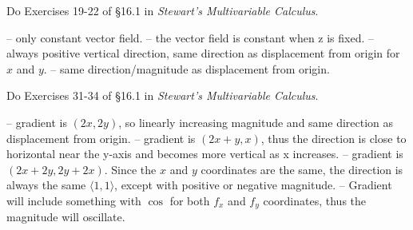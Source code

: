 \documentclass[12pt]{exam}
\begin{document}
\begin{questions}
\begin{solution}
\begin{questions}
		\end{questions}
	\end{solution}
\setcounter{question}{7}
\question Do Exercises 19-22 of §16.1 in \emph{Stewart's Multivariable Calculus}.
	\begin{solution}
		\begin{questions}
			\setcounter{question}{18}
			\question {} -- only constant vector field.
			\question {} -- the vector field is constant when z is fixed.
			\question {} -- always positive vertical direction, same direction as displacement from origin for $x$ and $y$.
			\question {} -- same direction/magnitude as displacement from origin.
		\end{questions}
	\end{solution}
\setcounter{question}{8}
\question Do Exercises 31-34 of §16.1 in \emph{Stewart's Multivariable Calculus}.
	\begin{solution}
		\begin{questions}
			\setcounter{question}{30}
			\question {} -- gradient is $(2x, 2y)$, so linearly increasing magnitude and same direction as displacement from origin.
			\question {} -- gradient is $(2x + y, x)$, thus the direction is close to horizontal near the y-axis and becomes more vertical as x increases.
			\question {} -- gradient is $(2x + 2y, 2y + 2x)$. Since the $x$ and $y$ coordinates are the same, the direction is always the same $\langle 1, 1 \rangle$, except with positive or negative magnitude.
			\question {} -- Gradient will include something with $\cos$ for both $f_x$ and $f_y$ coordinates, thus the magnitude will oscillate.
		\end{questions}
	\end{solution}
\end{questions}
\end{document}
